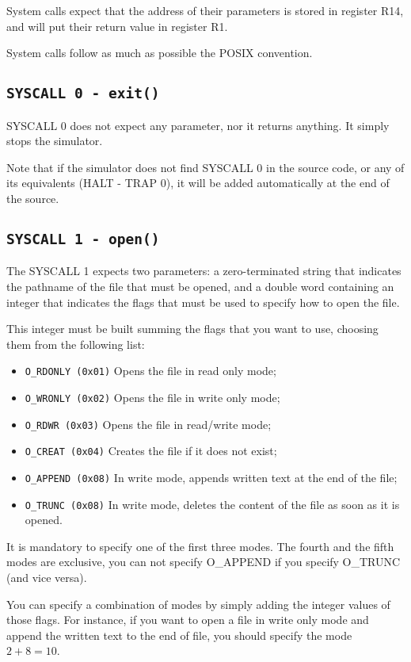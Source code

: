 \documentclass[12pt]{report}
\begin{document}
System calls expect that the address of their parameters is stored in register
R14, and will put their return value in register R1.

System calls follow as much as possible the POSIX convention.

\subsection{\texttt{SYSCALL 0 - exit()}}
SYSCALL 0 does not expect any parameter, nor it returns anything. It simply stops
the simulator.

Note that if the simulator does not find SYSCALL 0 in the source code, or any of
its equivalents (HALT - TRAP 0), it will be added automatically at the end of
the source.

\subsection{\texttt{SYSCALL 1 - open()}}
\label{sys1}
The SYSCALL 1 expects two parameters: a zero-terminated string that indicates
the pathname of the file that must be opened, and a double word containing an
integer that indicates the flags that must be used to specify how to open the
file.

This integer must be built summing the flags that you want to use, choosing them
from the following list:
\begin{itemize}
	\item \texttt{O\_RDONLY (0x01)} Opens the file in read only mode;
	\item \texttt{O\_WRONLY (0x02)} Opens the file in write only mode;
	\item \texttt{O\_RDWR (0x03)} Opens the file in read/write mode;
	\item \texttt{O\_CREAT (0x04)} Creates the file if it does not exist;
	\item \texttt{O\_APPEND (0x08)} In write mode, appends written text at the end of the file;
	\item \texttt{O\_TRUNC (0x08)} In write mode, deletes the content of the file as soon as it is opened.
\end{itemize}

It is mandatory to specify one of the first three modes. The fourth and the
fifth modes are exclusive, you can not specify O\_APPEND if you specify O\_TRUNC
(and vice versa). 

You can specify a combination of modes by simply adding the integer values of
those flags. For instance, if you want to open a file in write only mode and
append the written text to the end of file, you should specify the mode $2 + 8 = 10$.
\end{document}
